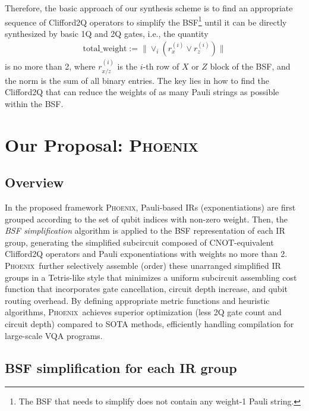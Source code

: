 \documentclass[conference,9pt]{IEEEtran}
\newcommand{\phoenix}{\textsc{Phoenix}}
\newcommand{\CNOT}{\mathrm{CNOT}}
\newcommand{\totalWeight}{\mathrm{total\_weight}}
\begin{document}
    Therefore, the basic approach of our synthesis scheme is to find an appropriate sequence of Clifford2Q operators to simplify the BSF\footnote{The BSF that needs to simplify does not contain any weight-1 Pauli string. } until it can be directly synthesized by basic 1Q and 2Q gates, i.e., the quantity
    \begin{align}
        \totalWeight := \lVert  \lor_i (r_x^{(i)}\lor r_z^{(i)})  \rVert
    \end{align}
    is no more than 2, where $r_{x/z}^{(i)}$ is the $i$-th row of $X$ or $Z$ block of the BSF, and the norm is the sum of all binary entries. The key lies in how to find the Clifford2Q that can reduce the weights of as many Pauli strings as possible within the BSF.




\section{Our Proposal: \phoenix}



\subsection{Overview}

    In the proposed framework \phoenix, Pauli-based IRs (exponentiations) are first grouped according to the set of qubit indices with non-zero weight. Then, the \emph{BSF simplification} algorithm is applied to the BSF representation of each IR group, generating the simplified subcircuit composed of $ \CNOT $-equivalent Clifford2Q operators and Pauli exponentiations with weights no more than 2. \phoenix\ further selectively assemble (order) these unarranged simplified IR groups in a Tetris-like style that minimizes a uniform subcircuit assembling cost function that incorporates gate cancellation, circuit depth increase, and qubit routing overhead. By defining appropriate metric functions and heuristic algorithms, \phoenix\ achieves superior optimization (less 2Q gate count and circuit depth) compared to SOTA methods, efficiently handling compilation for large-scale VQA programs. %



\subsection{BSF simplification for each IR group}
\end{document}
